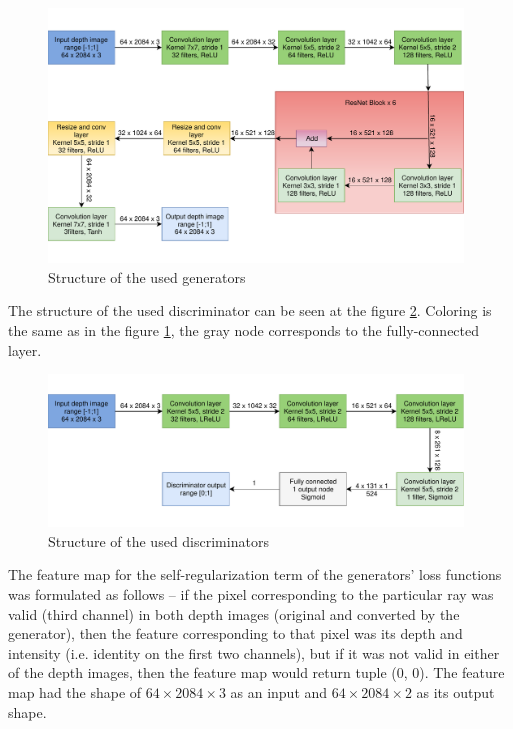 \begin{figure}
\centering
\includegraphics[keepaspectratio, width=0.98\textwidth]{img/gen.pdf}
\caption{Structure of the used generators}
\label{genstruct}
\end{figure}

The structure of the used discriminator can be seen at the figure \ref{disstruct}. Coloring is the same as in the figure \ref{genstruct}, the gray node corresponds to the fully-connected layer.

\begin{figure}
\centering
\includegraphics[keepaspectratio, width=0.98\textwidth]{img/disc.pdf}
\caption{Structure of the used discriminators}
\label{disstruct}
\end{figure}

The feature map for the self-regularization term of the generators' loss functions was formulated as follows -- if the pixel corresponding to the particular ray was valid (third channel) in both depth images (original and converted by the generator), then the feature corresponding to that pixel was its depth and intensity (i.e. identity on the first two channels), but if it was not valid in either of the depth images, then the feature map would return tuple (0, 0). The feature map had the shape of $64\times2084\times3$ as an input and $64\times2084\times2$ as its output shape.

